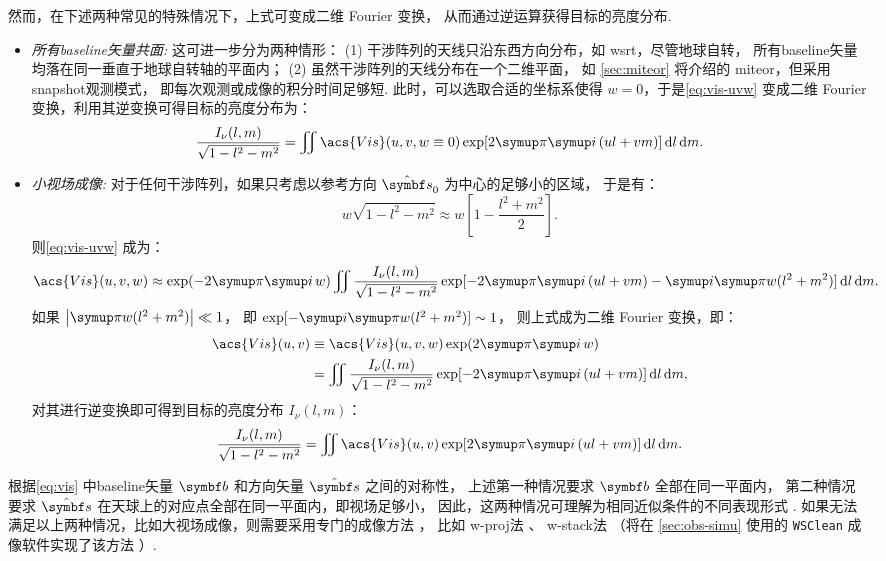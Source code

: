 然而，在下述两种常见的特殊情况下，上式可变成二维 Fourier 变换，
从而通过逆运算获得目标的亮度分布.
\begin{itemize}
\item
\emph{所有\ac{baseline}矢量共面:}
这可进一步分为两种情形：
(1) 干涉阵列的天线只沿东西方向分布，如 \ac{wsrt}，尽管地球自转，
所有\ac{baseline}矢量均落在同一垂直于地球自转轴的平面内；
(2) 虽然干涉阵列的天线分布在一个二维平面，
如 \autoref{sec:miteor} 将介绍的 \ac*{miteor}，但采用\ac{snapshot}观测模式，
即每次观测或成像的积分时间足够短.
此时，可以选取合适的坐标系使得 $w = 0$，于是\autoref{eq:vis-uvw}
变成二维 Fourier 变换，利用其逆变换可得目标的亮度分布为：
\begin{equation}
  \label{eq:vis-inv1}
  \frac{I_{\nu}(l,m)}{\sqrt{1-l^2-m^2}} = \iint \acs{Vis}(u,v, w \equiv 0)
    \exp [2\Cpi\Ci\, (ul+vm)] \,\D{l}\,\D{m}.
\end{equation}

\item
\emph{小视场成像:}
对于任何干涉阵列，如果只考虑以参考方向 $\hat{\B{s}}_0$ 为中心的足够小的区域，
于是有：
\begin{equation}
  w\sqrt{1-l^2-m^2} \approx w \left[ 1 - \frac{l^2+m^2}{2} \right].
\end{equation}
则\autoref{eq:vis-uvw} 成为：
\begin{equation}
  \acs{Vis}(u,v,w) \approx \exp (-2\Cpi\Ci\,w) \iint
    \frac{I_{\nu}(l,m)}{\sqrt{1-l^2-m^2}}
    \exp [-2\Cpi\Ci\, (ul+vm) -\Ci\Cpi w(l^2+m^2)] \,\D{l}\,\D{m}.
\end{equation}
如果 $\big| \Cpi w(l^2+m^2) \big| \ll 1$，
即 $\exp [-\Ci\Cpi w(l^2+m^2)] \sim 1$，
则上式成为二维 Fourier 变换，即：
\begin{align}
  \acs{Vis}(u,v)
    & \equiv \acs{Vis}(u,v,w) \exp (2\Cpi\Ci\,w)  \\
    & = \iint \frac{I_{\nu}(l,m)}{\sqrt{1-l^2-m^2}}
    \exp [-2\Cpi\Ci\, (ul+vm)] \,\D{l}\,\D{m},
  \label{eq:vis-uv}
\end{align}
对其进行逆变换即可得到目标的亮度分布 $I_{\nu}(l,m)$：
\begin{equation}
  \label{eq:vis-inv2}
  \frac{I_{\nu}(l,m)}{\sqrt{1-l^2-m^2}} = \iint \acs{Vis}(u,v)
    \exp [2\Cpi\Ci\, (ul+vm)] \,\D{l}\,\D{m}.
\end{equation}

\end{itemize}

根据\autoref{eq:vis} 中\ac{baseline}矢量 $\B{b}$
和方向矢量 $\hat{\B{s}}$ 之间的对称性，
上述第一种情况要求 $\B{b}$ 全部在同一平面内，
第二种情况要求 $\hat{\B{s}}$ 在天球上的对应点全部在同一平面内，即视场足够小，
因此，这两种情况可理解为相同近似条件的不同表现形式 \cite{clark1999}.
如果无法满足以上两种情况，比如大视场成像，则需要采用专门的成像方法
\cite{cornwell1992,sault2007}，
比如 \ac{w-proj}法 \cite{cornwell2008}、
\ac{w-stack}法 \cite{humphreys2011}
（将在 \autoref{sec:obs-simu} 使用的 \texttt{WSClean} 成像软件实现了该方法
\cite{offringa2014,offringa2017}）.

